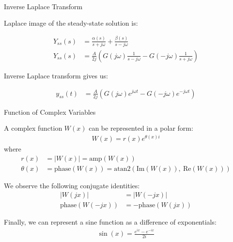 \documentclass{beamer}
\begin{document}
\begin{frame}{Inverse Laplace Transform}
	\begin{flushleft}
		
		Laplace image of the steady-state solution is:
		
		\begin{align}
			 Y_{ss}(s) &= \frac{\alpha(s)}{s + j\omega} + \frac{\beta(s)}{s - j\omega}
			 \\
			 Y_{ss}(s)  &=
			 \frac{A}{2j}
			 \left(
			 G(j\omega)\frac{1}{s - j\omega} -G(-j\omega) \frac{1}{s + j\omega}
			 \right)
		\end{align}
		
		Inverse Laplace transform gives us:
		
		\begin{align}
			y_{ss}(t) &= 
			\frac{A}{2j}
			\left(
			G(j\omega)e^{ j\omega t} - G(-j\omega) e^{- j\omega t}
			\right)
		\end{align}
		
		
	\end{flushleft}
\end{frame}




\begin{frame}{Function of Complex Variables}
	\begin{flushleft}
		
		A complex function $W(x)$ can be represented in a polar form:
		\begin{align}
			W(x) = r(x) e^{\theta(x) i}
		\end{align}
		where 
		\begin{align}
			r(x) &= |W(x)| = \text{amp}(W(x))
			\\
			\theta(x) &= \text{phase}(W(x)) = \text{atan2}( \text{Im}(W(x)), \ \text{Re}(W(x))  )
		\end{align}
		
		We observe the following conjugate identities:
		\begin{align}
			|W(jx)| &= |W(-jx)|
			\\
			\text{phase}(W(-jx)) &= -\text{phase}(W(jx))
		\end{align}
		
		\bigskip
		
		Finally, we can represent a sine function as a difference of exponentials:
		\begin{align}
			\sin(x) = \frac{e^{ix}-e^{-ix}}{2i}
		\end{align}
		
	\end{flushleft}
\end{frame}
\end{document}
